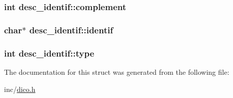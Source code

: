 \subsubsection[{\texorpdfstring{complement}{complement}}]{\setlength{\rightskip}{0pt plus 5cm}int desc\+\_\+identif\+::complement}\hypertarget{structdesc__identif_a6db63bc659a03181e2fa928c5d350d7e}{}\label{structdesc__identif_a6db63bc659a03181e2fa928c5d350d7e}
\subsubsection[{\texorpdfstring{identif}{identif}}]{\setlength{\rightskip}{0pt plus 5cm}char$\ast$ desc\+\_\+identif\+::identif}\hypertarget{structdesc__identif_a6239e167bc752c6bf15d9e494ca415c3}{}\label{structdesc__identif_a6239e167bc752c6bf15d9e494ca415c3}
\subsubsection[{\texorpdfstring{type}{type}}]{\setlength{\rightskip}{0pt plus 5cm}int desc\+\_\+identif\+::type}\hypertarget{structdesc__identif_a80c4c518d38eb63511383eef8241ffe2}{}\label{structdesc__identif_a80c4c518d38eb63511383eef8241ffe2}


The documentation for this struct was generated from the following file\+:\begin{DoxyCompactItemize}
\item 
inc/\hyperlink{dico_8h}{dico.\+h}\end{DoxyCompactItemize}

